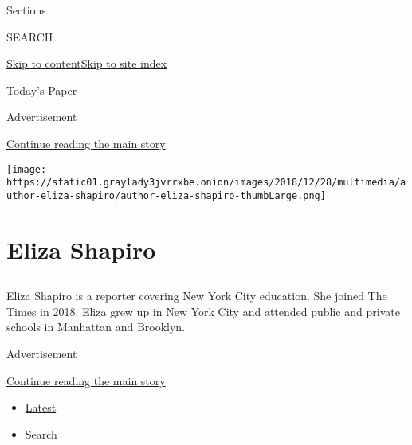 Sections

SEARCH

\protect\hyperlink{site-content}{Skip to
content}\protect\hyperlink{site-index}{Skip to site index}

\href{https://myaccount.nytimes3xbfgragh.onion/auth/login?response_type=cookie\&client_id=vi}{}

\href{https://www.nytimes3xbfgragh.onion/section/todayspaper}{Today's
Paper}

Advertisement

\protect\hyperlink{after-top}{Continue reading the main story}

\texttt{[image: https://static01.graylady3jvrrxbe.onion/images/2018/12/28/multimedia/author-eliza-shapiro/author-eliza-shapiro-thumbLarge.png]}

\hypertarget{eliza-shapiro}{%
\section{Eliza Shapiro}\label{eliza-shapiro}}

\subsection{}

Eliza Shapiro is a reporter covering New York City education. She joined
The Times in 2018. Eliza grew up in New York City and attended public
and private schools in Manhattan and Brooklyn.

Advertisement

\protect\hyperlink{after-mid1}{Continue reading the main story}

\begin{itemize}
\tightlist
\item
  \protect\hyperlink{stream-panel}{Latest}
\item
  Search
\end{itemize}

